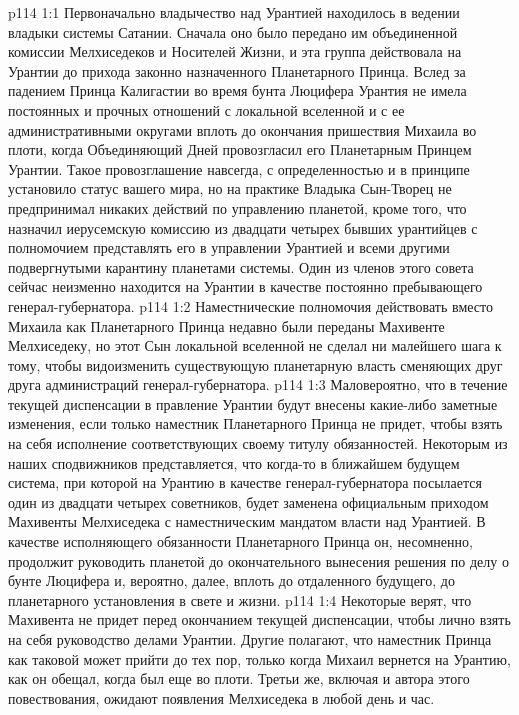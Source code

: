 \vs p114 1:1 Первоначально владычество над Урантией находилось в ведении владыки системы Сатании. Сначала оно было передано им объединенной комиссии Мелхиседеков и Носителей Жизни, и эта группа действовала на Урантии до прихода законно назначенного Планетарного Принца. Вслед за падением Принца Калигастии во время бунта Люцифера Урантия не имела постоянных и прочных отношений с локальной вселенной и с ее административными округами вплоть до окончания пришествия Михаила во плоти, когда Объединяющий Дней провозгласил его Планетарным Принцем Урантии. Такое провозглашение навсегда, с определенностью и в принципе установило статус вашего мира, но на практике Владыка Сын\hyp{}Творец не предпринимал никаких действий по управлению планетой, кроме того, что назначил иерусемскую комиссию из двадцати четырех бывших урантийцев с полномочием представлять его в управлении Урантией и всеми другими подвергнутыми карантину планетами системы. Один из членов этого совета сейчас неизменно находится на Урантии в качестве постоянно пребывающего генерал\hyp{}губернатора.
\vs p114 1:2 Наместнические полномочия действовать вместо Михаила как Планетарного Принца недавно были переданы Махивенте Мелхиседеку, но этот Сын локальной вселенной не сделал ни малейшего шага к тому, чтобы видоизменить существующую планетарную власть сменяющих друг друга администраций генерал\hyp{}губернатора.
\vs p114 1:3 Маловероятно, что в течение текущей диспенсации в правление Урантии будут внесены какие\hyp{}либо заметные изменения, если только наместник Планетарного Принца не придет, чтобы взять на себя исполнение соответствующих своему титулу обязанностей. Некоторым из наших сподвижников представляется, что когда\hyp{}то в ближайшем будущем система, при которой на Урантию в качестве генерал\hyp{}губернатора посылается один из двадцати четырех советников, будет заменена официальным приходом Махивенты Мелхиседека с наместническим мандатом власти над Урантией. В качестве исполняющего обязанности Планетарного Принца он, несомненно, продолжит руководить планетой до окончательного вынесения решения по делу о бунте Люцифера и, вероятно, далее, вплоть до отдаленного будущего, до планетарного установления в свете и жизни.
\vs p114 1:4 Некоторые верят, что Махивента не придет перед окончанием текущей диспенсации, чтобы лично взять на себя руководство делами Урантии. Другие полагают, что наместник Принца как таковой может прийти до тех пор, только когда Михаил вернется на Урантию, как он обещал, когда был еще во плоти. Третьи же, включая и автора этого повествования, ожидают появления Мелхиседека в любой день и час.
